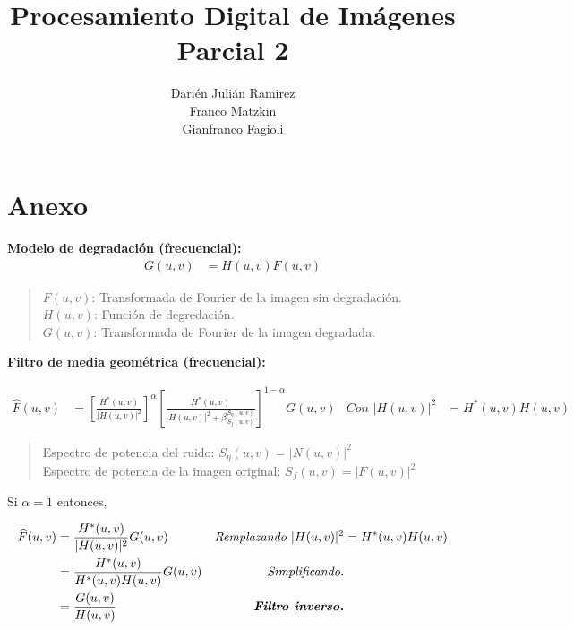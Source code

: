 \documentclass[a4paper,10pt,spanish]{article}
\title{\Huge Procesamiento Digital de Imágenes \\ Parcial 2} %
\author{Darién Julián Ramírez \\
		Franco Matzkin \\
        Gianfranco Fagioli} %
\date{\empty} %
\begin{document}
\maketitle %
\tableofcontents %

\section{Anexo}

\textbf{Modelo de degradación (frecuencial):}
\begin{align*}
G(u,v) &= H(u,v)F(u,v)
\end{align*}

\begin{quote}
$F(u,v)$: Transformada de Fourier de la imagen sin degradación. \\
$H(u,v)$: Función de degredación. \\
$G(u,v)$: Transformada de Fourier de la imagen degradada. \\
\end{quote}

\textbf{Filtro de media geométrica (frecuencial):}

\begin{align*}
\widehat{F}(u,v) &= \left[\frac{H^{*}(u,v)}{|H(u,v)|^{2}}\right]^{\alpha}
\left[\frac{H^{*}(u,v)}{|H(u,v)|^{2}+\beta\frac{S_{\eta}(u,v)}{S_{f}(u,v)}}\right]^{1-\alpha}
G(u,v)
& \textit{Con }|H(u,v)|^{2} &= H^{*}(u,v)H(u,v)
\end{align*}

\begin{quote}
Espectro de potencia del ruido: $S_{\eta}(u,v)=|N(u,v)|^{2}$ \\
Espectro de potencia de la imagen original: $S_{f}(u,v)=|F(u,v)|^{2}$ \\
\end{quote}

Si $\alpha=1$ entonces,

\begin{align*}
\widehat{F}(u,v) &= \frac{H^{*}(u,v)}{|H(u,v)|^{2}}G(u,v)
& \textit{Remplazando } |H(u,v)|^{2} &= H^{*}(u,v)H(u,v) \\
&= \frac{H^{*}(u,v)}{H^{*}(u,v)H(u,v)}G(u,v)
& \textit{Simplificando.} \\
&= \frac{G(u,v)}{H(u,v)}
& \textit{\textbf{Filtro inverso.}}
\end{align*}
\end{document}
